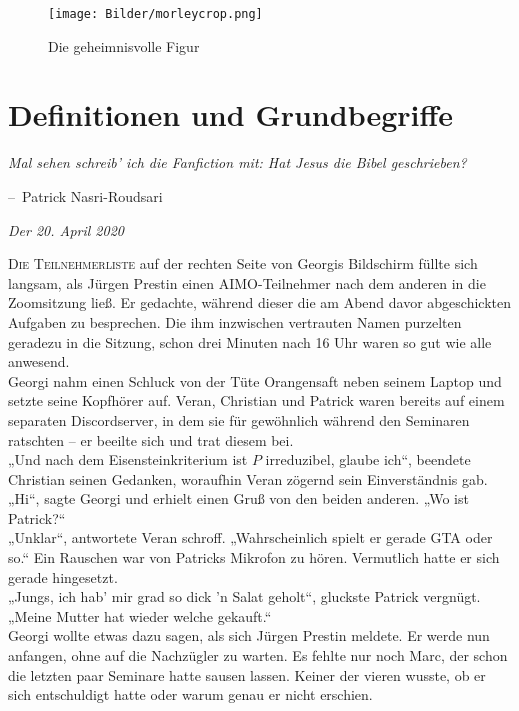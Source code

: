 \documentclass[oneside]{memoir}
\makeatletter
\newenvironment{chapquote}[2][2em]
  {\setlength{\@tempdima}{#1}%
   \def\chapquote@author{#2}%
   \parshape 1 \@tempdima \dimexpr\textwidth-2\@tempdima\relax%
   \itshape}
  {\par\normalfont\hfill--\ \chapquote@author\hspace*{\@tempdima}\par\bigskip}
\makeatother
\begin{document}
\begin{figure}[htbp] 
  \centering
     \texttt{[image: Bilder/morleycrop.png]}
  \caption{Die geheimnisvolle Figur}
\end{figure}

\chapter{Definitionen und Grundbegriffe} %
\begin{chapquote}{Patrick Nasri-Roudsari}
\glqq Mal sehen schreib' ich die Fanfiction mit: Hat Jesus die Bibel geschrieben?\grqq
\end{chapquote}

\textit{Der 20. April 2020}

\medskip
\lettrine{D}{ie Teilnehmerliste} auf der rechten Seite von Georgis Bildschirm füllte sich langsam, als Jürgen Prestin einen AIMO-Teilnehmer nach dem anderen in die Zoomsitzung ließ. Er gedachte, während dieser die am Abend davor abgeschickten Aufgaben zu besprechen. Die ihm inzwischen vertrauten Namen purzelten geradezu in die Sitzung, schon drei Minuten nach 16 Uhr waren so gut wie alle anwesend. \\
Georgi nahm einen Schluck von der Tüte Orangensaft neben seinem Laptop und setzte seine Kopfhörer auf. Veran, Christian und Patrick waren bereits auf einem separaten Discordserver, in dem sie für gewöhnlich während den Seminaren ratschten – er beeilte sich und trat diesem bei. \\
„Und nach dem Eisensteinkriterium ist $P$ irreduzibel, glaube ich“, beendete Christian seinen Gedanken, woraufhin Veran zögernd sein Einverständnis gab. \\
„Hi“, sagte Georgi und erhielt einen Gruß von den beiden anderen. „Wo ist Patrick?“ \\
„Unklar“, antwortete Veran schroff. „Wahrscheinlich spielt er gerade GTA oder so.“ Ein Rauschen war von Patricks Mikrofon zu hören. Vermutlich hatte er sich gerade hingesetzt. \\
„Jungs, ich hab' mir grad so dick 'n Salat geholt“, gluckste Patrick vergnügt. „Meine Mutter hat wieder welche gekauft.“ \\
Georgi wollte etwas dazu sagen, als sich Jürgen Prestin meldete. Er werde nun anfangen, ohne auf die Nachzügler zu warten. Es fehlte nur noch Marc, der schon die letzten paar Seminare hatte sausen lassen. Keiner der vieren wusste, ob er sich entschuldigt hatte oder warum genau er nicht erschien. \\
\end{document}
